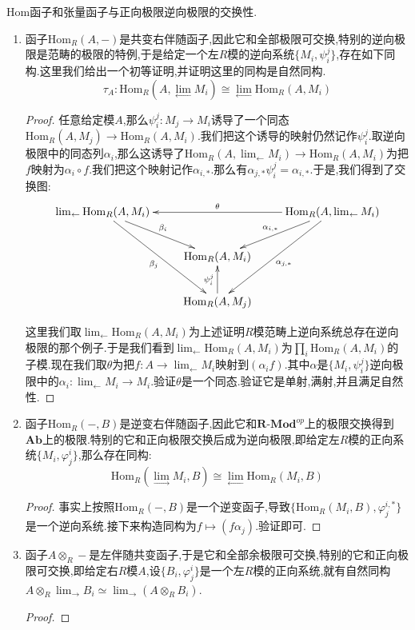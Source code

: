 Hom函子和张量函子与正向极限逆向极限的交换性.
\begin{enumerate}
	\item 函子$\mathrm{Hom}_R(A,-)$是共变右伴随函子,因此它和全部极限可交换,特别的逆向极限是范畴的极限的特例,于是给定一个左$R$模的逆向系统$\{M_i,\psi_i^j\}$,存在如下同构.这里我们给出一个初等证明,并证明这里的同构是自然同构.
	$$\tau_A:\mathrm{Hom} _R(A,\lim_{\leftarrow}M_i)\cong\lim_{\leftarrow}\mathrm{Hom}_R(A,M_i)$$
	\begin{proof}
		
		任意给定模$A$,那么$\psi_i^j:M_j\to M_i$诱导了一个同态$\mathrm{Hom} _R(A,M_j)\to\mathrm{Hom}_R(A,M_i)$.我们把这个诱导的映射仍然记作$\psi_i^j$.取逆向极限中的同态列$\alpha_i$,那么这诱导了$\mathrm{Hom} _R(A,\lim_{\leftarrow}M_i)\to\mathrm{Hom}_R(A,M_i)$为把$f$映射为$\alpha_i\circ f$.我们把这个映射记作$\alpha_{i,*}$.那么有$\alpha_ {j,*}\psi_i^j=\alpha_{i,*}$.于是,我们得到了交换图:
		$$\xymatrix{
			\lim_{\leftarrow}\mathrm{Hom}_R(A,M_i)\ar[ddr]_{\beta_j}\ar[dr]^{\beta_i}&&\mathrm{Hom}_R(A,\lim_{\leftarrow}M_i)\ar[dl]_{\alpha_{i,*}}\ar[ddl]^{\alpha_{j,*}}\ar[ll]_{\theta}\\
			&\mathrm{Hom}_R(A,M_i)&\\
			&\mathrm{Hom}_R(A,M_j)\ar[u]^{\psi_i^j}&
		}$$
		
		这里我们取$\lim_{\leftarrow}\mathrm{Hom}_R(A,M_i)$为上述证明$R$模范畴上逆向系统总存在逆向极限的那个例子.于是我们看到$\lim_ {\leftarrow}\mathrm{Hom}_R(A,M_i)$为$\prod_i\mathrm{Hom}_R(A,M_i)$的子模.现在我们取$\theta$为把$f:A\to\lim_{\leftarrow}M_i$映射到$(\alpha_if)$.其中$\alpha$是$\{M_i,\psi_i^j\}$逆向极限中的$\alpha_i:\lim_{\leftarrow}M_i\to M_i$.验证$\theta$是一个同态.验证它是单射,满射,并且满足自然性.
		
	\end{proof}
	\item 函子$\mathrm{Hom}_R(-,B)$是逆变右伴随函子,因此它和$\textbf{R-Mod}^{op}$上的极限交换得到$\textbf{Ab}$上的极限.特别的它和正向极限交换后成为逆向极限,即给定左$R$模的正向系统$\{M_i,\varphi_j^i\}$,那么存在同构:
	$$\mathrm{Hom}_R(\lim_{\rightarrow}M_i,B)\cong\lim_{\leftarrow}\mathrm{Hom}_R(M_i,B)$$
	\begin{proof}
		
		事实上按照$\mathrm{Hom}_R(-,B)$是一个逆变函子,导致$\{\mathrm{Hom} _R(M_i,B),\varphi_j^{i,*}\}$是一个逆向系统.接下来构造同构为$f\mapsto(f\alpha_j)$.验证即可.
	\end{proof}
    \item 函子$A\otimes_R-$是左伴随共变函子,于是它和全部余极限可交换,特别的它和正向极限可交换,即给定右$R$模$A$,设$\{B_i,\varphi_j^i\}$是一个左$R$模的正向系统,就有自然同构$A\otimes_R\lim_ {\rightarrow}B_i\simeq\lim_{\rightarrow}(A\otimes_RB_i)$.
    \begin{proof}
    	

\end{proof}
\end{enumerate}
